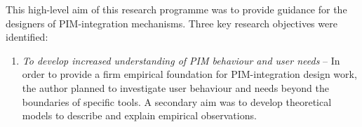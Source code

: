 This high-level aim of this research programme was to provide guidance for the designers of PIM-integration mechanisms.  Three key research objectives were identified:
\begin{enumerate}

\item \textit{To develop increased understanding of PIM behaviour and user needs} -- In order to provide a firm empirical foundation for PIM-integration design work, the author planned to investigate user behaviour and needs beyond the boundaries of specific tools.
A secondary aim was to develop theoretical models to describe and explain empirical observations.



\end{enumerate}

